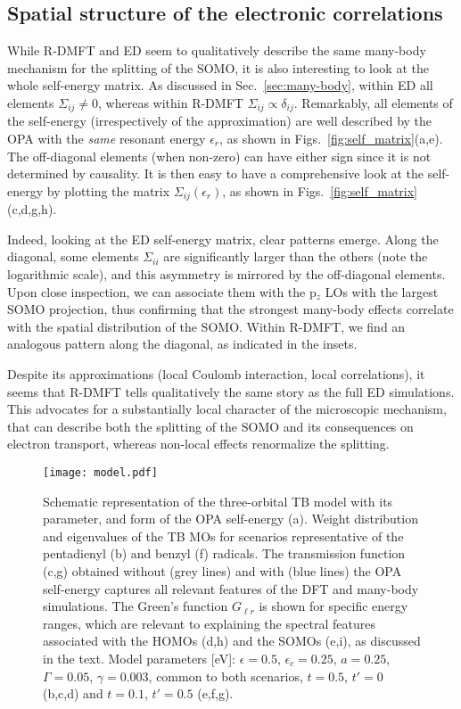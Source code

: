 \documentclass[aps,prx,twocolumn,superscriptaddress]{revtex4-2}
\begin{document}
\subsection{Spatial structure of the electronic correlations}\label{sec:locality}
While R-DMFT and ED seem to qualitatively describe the same many-body mechanism 
for the splitting of the SOMO, 
it is also interesting to look at the whole self-energy matrix. 
As discussed in Sec.~\ref{sec:many-body}, 
within ED all elements $\Sigma_{ij}\neq 0$, whereas within R-DMFT $\Sigma_{ij} \propto \delta_{ij}$. 
Remarkably, all elements of the self-energy (irrespectively of the approximation) 
are well described by the OPA with the \emph{same} resonant energy $\epsilon_r$, 
as shown in Figs.~\ref{fig:self_matrix}(a,e).
The off-diagonal elements (when non-zero) can have either sign since it is not determined by causality.    
It is then easy to have a comprehensive look at the self-energy 
by plotting the matrix $\Sigma_{ij}(\epsilon_r)$, 
as shown in Figs.~\ref{fig:self_matrix}(c,d,g,h). 

Indeed, looking at the ED self-energy matrix, clear patterns emerge.
Along the diagonal, some elements $\Sigma_{ii}$ are significantly larger than the others 
(note the logarithmic scale), 
and this asymmetry is mirrored by the off-diagonal elements. 
Upon close inspection, we can associate them with the p$_z$ LOs with the largest SOMO projection, 
thus confirming that the strongest many-body effects correlate with the spatial distribution of the SOMO. 
Within R-DMFT, we find an analogous pattern along the diagonal, as indicated in the insets. 

Despite its approximations (local Coulomb interaction, local correlations), 
it seems that R-DMFT tells qualitatively the same story as the full ED simulations. 
This advocates for a substantially local character of the microscopic mechanism, 
that can describe both the splitting of the SOMO and its consequences on electron transport, 
whereas non-local effects renormalize the splitting. 




\begin{figure*}[htp]
\texttt{[image: model.pdf]}
\caption{Schematic representation of the three-orbital TB model with its parameter, and form of the OPA self-energy (a). 
Weight distribution and eigenvalues of the TB MOs for scenarios representative of the pentadienyl (b) and benzyl (f) radicals. 
The transmission function (c,g) obtained without (grey lines) and with (blue lines) the OPA self-energy 
captures all relevant features of the DFT and many-body simulations. 
The Green's function $G_{\ell r}$ is shown for specific energy ranges, 
which are relevant to explaining the spectral features associated with the HOMOs (d,h) and the SOMOs (e,i), 
as discussed in the text. 
Model parameters [eV]: $\epsilon=0.5$, $\epsilon_c=0.25$, $a=0.25$, $\Gamma=0.05$, $\gamma=0.003$, common to both scenarios, 
$t=0.5$, $t'=0$ (b,c,d) and $t=0.1$, $t'=0.5$ (e,f,g). }
\label{fig:model}  
\end{figure*}
\end{document}
